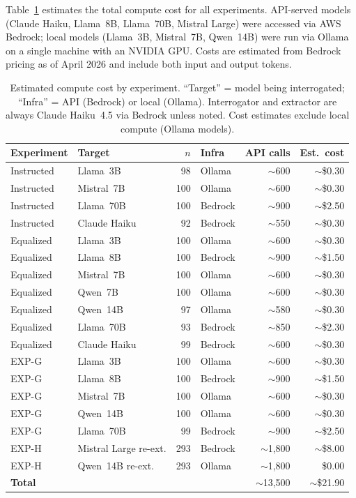Table~\ref{tab:compute_cost} estimates the total compute cost for all experiments. API-served models (Claude Haiku, Llama~8B, Llama~70B, Mistral Large) were accessed via AWS Bedrock; local models (Llama~3B, Mistral~7B, Qwen~14B) were run via Ollama on a single machine with an NVIDIA GPU. Costs are estimated from Bedrock pricing as of April 2026 and include both input and output tokens.

\begin{table}[h]
\centering
\caption{Estimated compute cost by experiment. ``Target'' = model being interrogated; ``Infra'' = API (Bedrock) or local (Ollama). Interrogator and extractor are always Claude Haiku~4.5 via Bedrock unless noted. Cost estimates exclude local compute (Ollama models).}
\label{tab:compute_cost}
\begin{small}
\begin{tabular}{llrlrr}
\toprule
\textbf{Experiment} & \textbf{Target} & \textbf{$n$} & \textbf{Infra} & \textbf{API calls} & \textbf{Est.\ cost} \\
\midrule
Instructed & Llama~3B & 98 & Ollama & $\sim$600 & $\sim$\$0.30 \\
Instructed & Mistral~7B & 100 & Ollama & $\sim$600 & $\sim$\$0.30 \\
Instructed & Llama~70B & 100 & Bedrock & $\sim$900 & $\sim$\$2.50 \\
Instructed & Claude Haiku & 92 & Bedrock & $\sim$550 & $\sim$\$0.30 \\
\midrule
Equalized & Llama~3B & 100 & Ollama & $\sim$600 & $\sim$\$0.30 \\
Equalized & Llama~8B & 100 & Bedrock & $\sim$900 & $\sim$\$1.50 \\
Equalized & Mistral~7B & 100 & Ollama & $\sim$600 & $\sim$\$0.30 \\
Equalized & Qwen~7B & 100 & Ollama & $\sim$600 & $\sim$\$0.30 \\
Equalized & Qwen~14B & 97 & Ollama & $\sim$580 & $\sim$\$0.30 \\
Equalized & Llama~70B & 93 & Bedrock & $\sim$850 & $\sim$\$2.30 \\
Equalized & Claude Haiku & 99 & Bedrock & $\sim$600 & $\sim$\$0.30 \\
\midrule
EXP-G & Llama~3B & 100 & Ollama & $\sim$600 & $\sim$\$0.30 \\
EXP-G & Llama~8B & 100 & Bedrock & $\sim$900 & $\sim$\$1.50 \\
EXP-G & Mistral~7B & 100 & Ollama & $\sim$600 & $\sim$\$0.30 \\
EXP-G & Qwen~14B & 100 & Ollama & $\sim$600 & $\sim$\$0.30 \\
EXP-G & Llama~70B & 99 & Bedrock & $\sim$900 & $\sim$\$2.50 \\
\midrule
EXP-H & Mistral Large re-ext. & 293 & Bedrock & $\sim$1,800 & $\sim$\$8.00 \\
EXP-H & Qwen~14B re-ext. & 293 & Ollama & $\sim$1,800 & \$0.00 \\
\midrule
\multicolumn{4}{l}{\textbf{Total}} & $\sim$13,500 & $\sim$\$21.90 \\
\bottomrule
\end{tabular}
\end{small}
\end{table}

